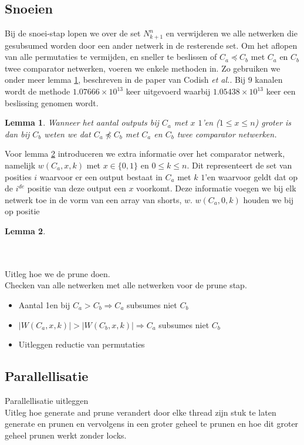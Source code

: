 \documentclass{article}
\newtheorem{lemma}{Lemma}
\begin{document}
\subsection{Snoeien}
Bij de snoei-stap lopen we over de set $N^n_{k+1}$ en verwijderen we alle netwerken die gesubsumed worden door een ander netwerk in de resterende set.
Om het aflopen van alle permutaties te vermijden, en sneller te beslissen of $C_a \preceq C_b$ met $C_a$ en $C_b$ twee comparator netwerken, voeren we enkele methoden in.
Zo gebruiken we onder meer lemma \ref{lemma3}, beschreven in de paper van Codish \textit{et al.}\cite{sortingNetworksSize2014}.
Bij $9$ kanalen wordt de methode $1.07666 \times 10^{13}$ keer uitgevoerd waarbij $1.05438 \times 10^{13}$ keer een beslissing genomen wordt. %
\begin{lemma}
Wanneer het aantal outputs bij $C_a$ met $x$ $1$'en ($1 \leq x \leq n$) groter is dan bij $C_b$ weten we dat $C_a \npreceq C_b$ met $C_a$ en $C_b$ twee comparator netwerken.
\label{lemma3}
\end{lemma}
Voor lemma \ref{lemma4} introduceren we extra informatie over het comparator netwerk, namelijk $w\left(C_a, x, k\right)$ met $x \in \{0,1\}$ en $0\leq k \leq n$.
Dit representeert de set van posities $i$ waarvoor er een output bestaat in $C_a$ met $k$ $1$'en waarvoor geldt dat op de $i^{de}$ positie van deze output een $x$ voorkomt.
Deze informatie voegen we bij elk netwerk toe in de vorm van een array van shorts, $w$.
$w\left(C_a,0,k\right)$ houden we bij op positie  
\begin{lemma}

\label{lemma4}
\end{lemma}

~\\\\
Uitleg hoe we de prune doen.\\
Checken  van alle netwerken met alle netwerken voor de prune stap.
\begin{itemize}
\item Aantal 1en bij $C_a > C_b \Rightarrow C_a$ subsumes niet $C_b$ 
\item $|W(C_a, x, k)| > |W(C_b, x, k)| \Rightarrow C_a$ subsumes niet $C_b$
\item Uitleggen reductie van permutaties
\end{itemize}

\subsection{Parallellisatie}
Parallellisatie uitleggen\\
Uitleg hoe generate and prune verandert door elke thread zijn stuk te laten generate en prunen en vervolgens in een groter geheel te prunen en hoe dit groter geheel prunen werkt zonder locks.
\end{document}
